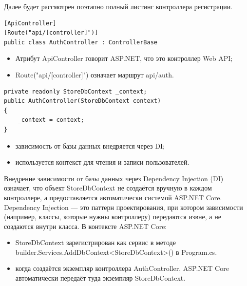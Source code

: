 \documentclass[12pt]{article}
\renewcommand{\texttt}[1]{{\small\ttfamily #1}}
\numberwithin{listing}{section}
\numberwithin{figure}{section}
\begin{document}
\noindent Далее будет рассмотрен поэтапно полный листинг контроллера регистрации.
\begin{verbatim}
[ApiController]
[Route("api/[controller]")]
public class AuthController : ControllerBase
\end{verbatim}
\begin{itemize}
	\item Атрибут \texttt{ApiController} говорит ASP.NET, что это контроллер Web API;
	\item \texttt{Route("api/[controller]")} означает маршрут \texttt{api/auth}.
\end{itemize}
\begin{verbatim}
private readonly StoreDbContext _context;
public AuthController(StoreDbContext context)
{
    _context = context;
}
\end{verbatim}
\begin{itemize}
	\item зависимость от базы данных внедряется через DI;
	\item используется контекст для чтения и записи пользователей.
\end{itemize}
Внедрение зависимости от базы данных через Dependency Injection (DI) означает, что объект \texttt{StoreDbContext} не создаётся вручную в каждом контроллере, а предоставляется автоматически системой ASP.NET Core.
Dependency Injection — это паттерн проектирования, при котором зависимости (например, классы, которые нужны контроллеру) передаются извне, а не создаются внутри класса.
В контексте ASP.NET Core:
\begin{itemize}
	\item \texttt{StoreDbContext} зарегистрирован как сервис в методе \texttt{builder.Services.AddDbContext<StoreDb\-Context>()} в \texttt{Program.cs}.
	\item когда создаётся экземпляр контроллера \texttt{AuthController}, ASP.NET Core автоматически передаёт туда экземпляр \texttt{StoreDbContext}.
\end{itemize}
\end{document}
